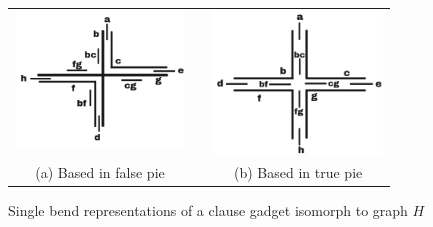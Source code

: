 \begin{figure}[htb]
  \centering
  \begin{tabular}{c c c }
    \includegraphics[width=4.5cm]{./img/falsePie.png}  %
    & &\includegraphics[width=4.5cm]{./img/truePie.png} %
    \\%
    {\footnotesize (a) Based in false pie}  & &  {\footnotesize(b) Based in true pie}\\
  \end{tabular}
  \caption{Single bend representations of a clause gadget isomorph to graph $H$
  }\label{fig:falseAndTruePie}
\end{figure} 